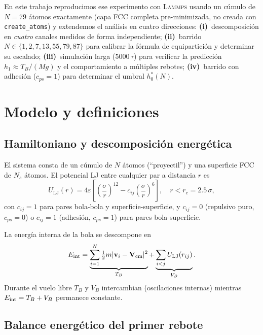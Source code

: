 \documentclass[12pt,a4paper]{article}
\newcommand{\eps}{\varepsilon}
\newcommand{\lammps}{\textsc{Lammps}}
\begin{document}
En este trabajo reproducimos ese experimento con \lammps{} usando un cúmulo de
$N=79$ átomos exactamente (capa FCC completa pre-minimizada, no creada con
\texttt{create\_atoms}) y extendemos el análisis en cuatro direcciones:
\textbf{(i)}~descomposición en \emph{cuatro} canales medidos de forma independiente;
\textbf{(ii)}~barrido $N\in\{1,2,7,13,55,79,87\}$ para calibrar la fórmula de
equipartición y determinar su escalado;
\textbf{(iii)}~simulación larga ($5000\,\tau$) para verificar la predicción
$h_1\approx T_B/(Mg)$ y el comportamiento a múltiples rebotes;
\textbf{(iv)}~barrido con adhesión ($c_{ps}=1$) para determinar el umbral
$h_0^*(N)$.

\section{Modelo y definiciones}
\label{sec:modelo}

\subsection{Hamiltoniano y descomposición energética}
\label{sec:hamiltoniano}

El sistema consta de un cúmulo de $N$ átomos (``proyectil'') y una superficie
FCC de $N_s$ átomos. El potencial LJ entre cualquier par a distancia $r$ es
\begin{equation}
    U_{\mathrm{LJ}}(r) = 4\eps \left[ \left(\frac{\sigma}{r}\right)^{12}
    - c_{ij}\left(\frac{\sigma}{r}\right)^{6} \right],
    \quad r < r_c = 2.5\,\sigma,
    \label{eq:lj}
\end{equation}
con $c_{ij}=1$ para pares bola-bola y superficie-superficie, y $c_{ij}=0$
(repulsivo puro, $c_{ps}=0$) o $c_{ij}=1$ (adhesión, $c_{ps}=1$) para
pares bola-superficie.

La energía interna de la bola se descompone en
\begin{equation}
    E_{\mathrm{int}} =
    \underbrace{\sum_{i=1}^{N}\tfrac{1}{2}m|\mathbf{v}_i-\mathbf{V}_{\rm cm}|^2}_{T_B}
    +
    \underbrace{\sum_{i<j}U_{\mathrm{LJ}}(r_{ij})}_{V_B}.
    \label{eq:TB_VB}
\end{equation}
Durante el vuelo libre $T_B$ y $V_B$ intercambian (oscilaciones internas)
mientras $E_{\rm int}=T_B+V_B$ permanece constante.

\subsection{Balance energético del primer rebote}
\label{sec:balance}
\end{document}
